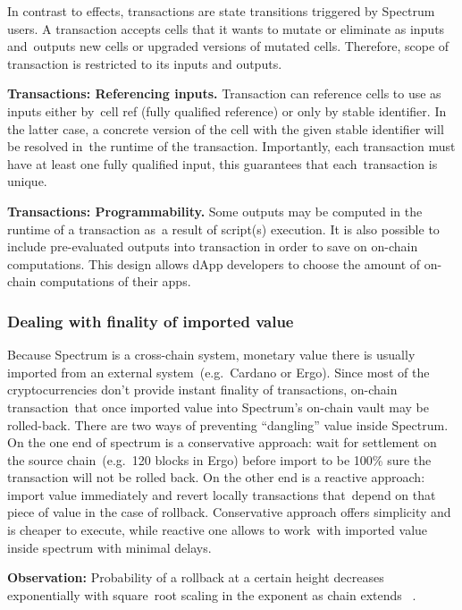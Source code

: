 In contrast to effects, transactions are state transitions triggered by Spectrum users.
A transaction accepts cells that it wants to mutate or eliminate as inputs and\
outputs new cells or upgraded versions of mutated cells.
Therefore, scope of transaction is restricted to its inputs and outputs.

\textbf{Transactions: Referencing inputs.} Transaction can reference cells to use as inputs either by\
cell ref (fully qualified reference) or only by stable identifier.
In the latter case, a concrete version of the cell with the given stable identifier will be resolved in\
the runtime of the transaction.
Importantly, each transaction must have at least one fully qualified input, this guarantees that each\
transaction is unique.

\textbf{Transactions: Programmability.} Some outputs may be computed in the runtime of a transaction as\
a result of script(s) execution.
It is also possible to include pre-evaluated outputs into transaction in order to save on on-chain computations.
This design allows dApp developers to choose the amount of on-chain computations of their apps.

\subsubsection{Dealing with finality of imported value}\label{subsubsec:dealing-with-finality-of-imported-value}

Because Spectrum is a cross-chain system, monetary value there is usually imported from an external system\
(e.g.\ Cardano or Ergo).
Since most of the cryptocurrencies don't provide instant finality of transactions, on-chain transaction\
that once imported value into Spectrum's on-chain vault may be rolled-back.
There are two ways of preventing \enquote{dangling} value inside Spectrum.
On the one end of spectrum is a conservative approach: wait for settlement on the source chain\
(e.g.\ 120 blocks in Ergo) before import to be 100\% sure the transaction will not be rolled back.
On the other end is a reactive approach: import value immediately and revert locally transactions that\
depend on that piece of value in the case of rollback.
Conservative approach offers simplicity and is cheaper to execute, while reactive one allows to work\
with imported value inside spectrum with minimal delays.

\textbf{Observation:} Probability of a rollback at a certain height decreases exponentially with square\
root scaling in the exponent as chain extends ~\cite{cryptoeprint:2017/573}.

